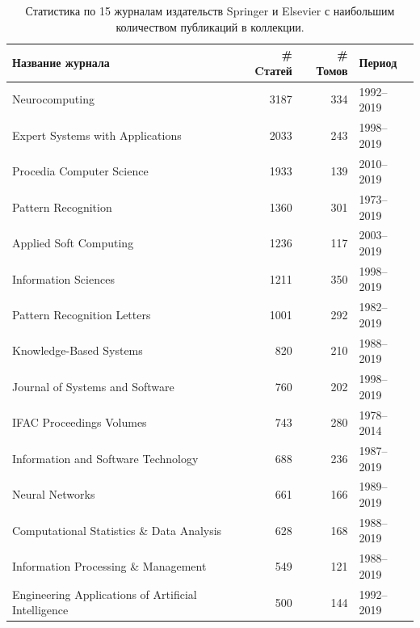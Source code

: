 \documentclass[12pt]{article}
\begin{document}
\begin{table}
	\def\arraystretch{0.8}
	\centering
	{\small
		\begin{tabular}{lrrl}
			\toprule
			Название журнала                                    &  \# Cтатей     & \# Томов & Период     \\
			\midrule
			Neurocomputing                                      &  3187 &  334 &  1992--2019 \\
			Expert Systems with Applications                    &  2033 &  243 &  1998--2019 \\
			Procedia Computer Science                           &  1933 &  139 &  2010--2019 \\
			Pattern Recognition                                 &  1360 &  301 &  1973--2019 \\
			Applied Soft Computing                              &  1236 &  117 &  2003--2019 \\
			Information Sciences                                &  1211 &  350 &  1998--2019 \\
			Pattern Recognition Letters                         &  1001 &  292 &  1982--2019 \\
			Knowledge-Based Systems                             &  820 &  210 &  1988--2019 \\
			Journal of Systems and Software                     &  760 &  202 &  1998--2019 \\
			IFAC Proceedings Volumes                            &  743 &  280 &  1978--2014 \\
			Information and Software Technology                 &  688 &  236 &  1987--2019 \\
			Neural Networks                                     &  661 &  166 &  1989--2019 \\
			Computational Statistics \& Data Analysis            &  628 &  168 &  1988--2019 \\
			Information Processing \& Management                 &  549 &  121 &  1988--2019 \\
			Engineering Applications of Artificial Intelligence &  500 &  144 &  1992--2019 \\
			\bottomrule
	\end{tabular}}
	\caption{Статистика по 15 журналам издательств Springer и Elsevier с наибольшим количеством публикаций в коллекции.}
	\label{table:papers}
\end{table}

\end{document}
